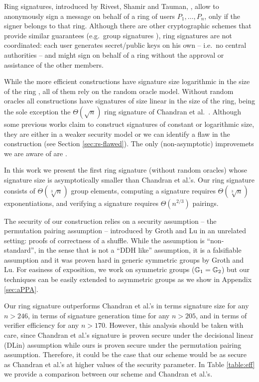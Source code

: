 Ring signatures, introduced by Rivest, Shamir and Tauman, \cite{AC:RivShaTau01}, allow to anonymously sign a message on behalf of a ring of users $P_1,\ldots,P_n$, only if the signer belongs to that ring. Although there are other cryptographic schemes that provide similar guarantees (e.g.~group signatures \cite{EC:ChaVan91}), ring signatures are not coordinated: each user generates secret/public keys on his own -- i.e.~no central authorities -- and might sign on behalf of a ring without the approval or assistance of the other members.

While the more efficient constructions have signature size logarithmic in the size of the ring \cite{EC:GroKoh15,EC:LLNW16}, all of them rely on the {random oracle model}.
Without random oracles all constructions have signatures of size linear in the size of the ring, being the sole exception the $\Theta(\sqrt{n})$ ring signature of Chandran et al.~\cite{ICALP:ChaGroSah07}. 
Although some previous works claim to construct signatures of constant \cite{ACISP:BosDasRan15} or logarithmic \cite{IET:GriSusPla16} size, they are either in a weaker security model or we can identify a flaw in the construction (see Section \ref{sec:rs-flawed}). The only (non-asymptotic) improvemets we are aware of are \cite{TCC:Rafols15,AC:GonHevRaf15}.

In this work we present the first ring signature (without random oracles) whose signature size is asymptotically smaller than Chandran et al.'s. Our ring signature consists of $\Theta(\sqrt[3]{n})$ group elements, computing a signature requires $\Theta(\sqrt[3]{n})$ exponentiations, and verifying a signature requires $\Theta(n^{2/3})$ pairings.

The security of our construction relies on a security assumption -- the {permutation pairing assumption} -- introduced by Groth and Lu \cite{AC:GroLu07} in an unrelated setting: proofs of correctness of a shuffle. While the assumption is ``non-standard'', in the sense that is not a ``DDH like'' assumption, it is a falsifiable assumption and it was proven hard in generic symmetric groups by Groth and Lu. For easiness of exposition, we work on symmetric groups ($\mathbb{G}_1=\mathbb{G}_2$) but our techniques can be easily extended to asymmetric groups as we show in Appendix \ref{sec:aPPA}.

Our ring signature outperforms Chandran et al.'s in terms signature size for any $n > 246$, in terms of signature generation time for any $n>205$, and in terms of verifier efficiency for any $n>170$. However, this analysis should be taken with care, since Chandran et al.'s signature is proven secure under the decisional linear (DLin) assumption while ours is proven secure under the permutation pairing assumption. Therefore, it could be the case that our scheme would be as secure as Chandran et al.'s at higher values of the security parameter. In Table \ref{table:eff} we provide a comparison between our scheme and Chandran et al.'s.


%
